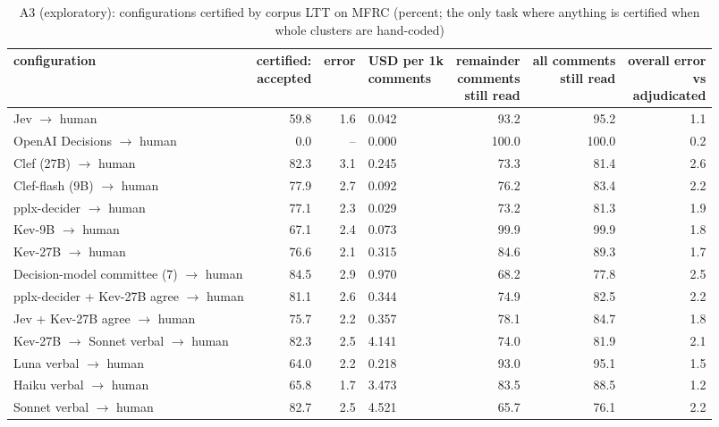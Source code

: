 \begin{table}[t]
\centering
\small
\caption{A3 (exploratory): configurations certified by corpus LTT on MFRC (percent; the only task where anything is certified when whole clusters are hand-coded)}
\label{tab:tab08b_cascades_certified}
\begin{adjustbox}{max width=\linewidth}
\begin{tabular}{lrrlrrr}
\toprule
configuration & \makecell[br]{certified: \\{} accepted} & error & \makecell[bl]{USD per 1k \\{} comments} & \makecell[br]{remainder \\{} comments \\{} still read} & \makecell[br]{all comments \\{} still read} & \makecell[br]{overall error \\{} vs \\{} adjudicated} \\
\midrule
Jev $\rightarrow$ human & 59.8 & 1.6 & 0.042 & 93.2 & 95.2 & 1.1 \\
OpenAI Decisions $\rightarrow$ human & 0.0 & -- & 0.000 & 100.0 & 100.0 & 0.2 \\
Clef (27B) $\rightarrow$ human & 82.3 & 3.1 & 0.245 & 73.3 & 81.4 & 2.6 \\
Clef-flash (9B) $\rightarrow$ human & 77.9 & 2.7 & 0.092 & 76.2 & 83.4 & 2.2 \\
pplx-decider $\rightarrow$ human & 77.1 & 2.3 & 0.029 & 73.2 & 81.3 & 1.9 \\
Kev-9B $\rightarrow$ human & 67.1 & 2.4 & 0.073 & 99.9 & 99.9 & 1.8 \\
Kev-27B $\rightarrow$ human & 76.6 & 2.1 & 0.315 & 84.6 & 89.3 & 1.7 \\
Decision-model committee (7) $\rightarrow$ human & 84.5 & 2.9 & 0.970 & 68.2 & 77.8 & 2.5 \\
pplx-decider + Kev-27B agree $\rightarrow$ human & 81.1 & 2.6 & 0.344 & 74.9 & 82.5 & 2.2 \\
Jev + Kev-27B agree $\rightarrow$ human & 75.7 & 2.2 & 0.357 & 78.1 & 84.7 & 1.8 \\
Kev-27B $\rightarrow$ Sonnet verbal $\rightarrow$ human & 82.3 & 2.5 & 4.141 & 74.0 & 81.9 & 2.1 \\
Luna verbal $\rightarrow$ human & 64.0 & 2.2 & 0.218 & 93.0 & 95.1 & 1.5 \\
Haiku verbal $\rightarrow$ human & 65.8 & 1.7 & 3.473 & 83.5 & 88.5 & 1.2 \\
Sonnet verbal $\rightarrow$ human & 82.7 & 2.5 & 4.521 & 65.7 & 76.1 & 2.2 \\

\end{tabular}
\end{adjustbox}
\end{table}
